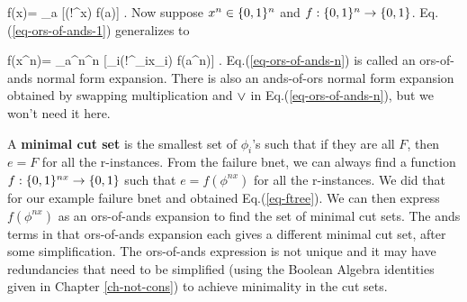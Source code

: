 \beq
f(x)= \V_{a\in\bool} [(!^{}x) f(a)]
\label{eq-ors-of-ands-1}
\;.
\eeq
Now suppose $x^n\in \{0,1\}^n$
and $f:\{0,1\}^n\rightarrow \{0,1\}$.
Eq.(\ref{eq-ors-of-ands-1})
generalizes to

\beq
f(x^n)= \V_{a^n\in\bool^n}
 [\prod_i(!^{_i}x_i) f(a^n)]
\label{eq-ors-of-ands-n}
\;.
\eeq
Eq.(\ref{eq-ors-of-ands-n})
is called an ors-of-ands normal form 
expansion.
There is also an ands-of-ors normal
form expansion 
obtained by swapping multiplication
and $\vee$
in Eq.(\ref{eq-ors-of-ands-n}), 
but we won't need it here.

A {\bf minimal cut
set} is the smallest set
of $\phi_i$'s such that
if they are all $F$,
then $e=F$ for all the
r-instances.
From the failure bnet,
we can always find 
a function $f:\{0,1\}^{nx}\rightarrow\{0,1\}$
such that
$e=f(\phi^{nx})$
for all the r-instances.
We did that for our
example failure
bnet and obtained Eq.(\ref{eq-ftree}).
We can
then
express 
$f(\phi^{nx})$ as an ors-of-ands expansion
to find the set of minimal cut sets.
The ands
terms in that ors-of-ands
expansion 
each gives
a different minimal cut set,
after some simplification.
The ors-of-ands
expression
is not unique
and it may have redundancies
that
need to be simplified
(using the Boolean Algebra identities
given in Chapter \ref{ch-not-cons})
to achieve minimality
in the cut sets.
